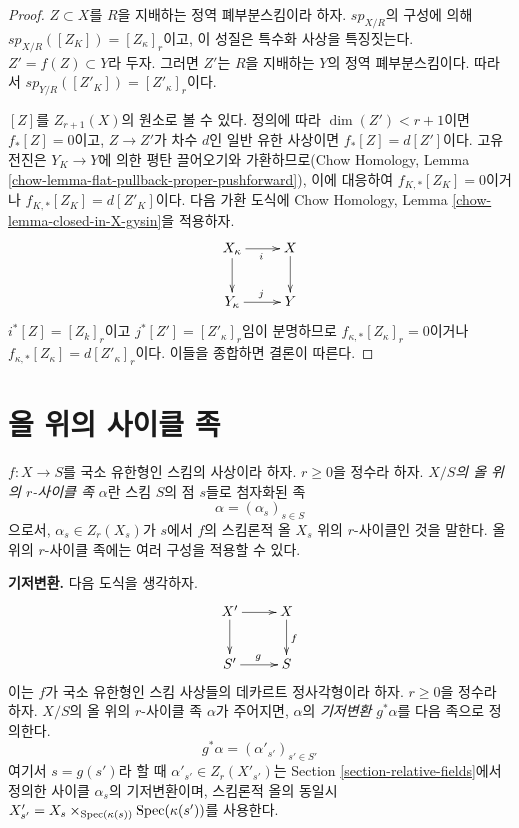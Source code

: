 \begin{proof}
$Z \subset X$를 $R$을 지배하는 정역 폐부분스킴이라 하자.
$sp_{X/R}$의 구성에 의해 $sp_{X/R}([Z_K]) = [Z_\kappa]_r$이고,
이 성질은 특수화 사상을 특징짓는다. $Z' = f(Z) \subset Y$라 두자.
그러면 $Z'$는 $R$을 지배하는 $Y$의 정역 폐부분스킴이다. 따라서
$sp_{Y/R}([Z'_K]) = [Z'_\kappa]_r$이다.

\medskip\noindent
$[Z]$를 $Z_{r + 1}(X)$의 원소로 볼 수 있다. 정의에 따라
$\dim(Z') < r + 1$이면 $f_*[Z] = 0$이고, $Z \to Z'$가 차수 $d$인
일반 유한 사상이면 $f_*[Z] = d[Z']$이다. 고유 전진은
$Y_K \to Y$에 의한 평탄 끌어오기와 가환하므로(Chow Homology,
Lemma \ref{chow-lemma-flat-pullback-proper-pushforward}), 이에 대응하여
$f_{K, *}[Z_K] = 0$이거나 $f_{K, *}[Z_K] = d[Z'_K]$이다.
다음 가환 도식에 Chow Homology, Lemma
\ref{chow-lemma-closed-in-X-gysin}을 적용하자.
$$
\xymatrix{
X_\kappa \ar[d] \ar[r]_i & X \ar[d] \\
Y_\kappa \ar[r]^j & Y
}
$$
$i^*[Z] = [Z_k]_r$이고 $j^*[Z'] = [Z'_\kappa]_r$임이 분명하므로
$f_{\kappa, *}[Z_\kappa]_r = 0$이거나
$f_{\kappa, *}[Z_\kappa] = d[Z'_\kappa]_r$이다. 이들을 종합하면
결론이 따른다.
\end{proof}


\section{올 위의 사이클 족}
\label{section-cycles-fibres}

\noindent
$f : X \to S$를 국소 유한형인 스킴의 사상이라 하자.
$r \geq 0$을 정수라 하자. {\it $X/S$의 올 위의 $r$-사이클 족
$\alpha$}란 스킴 $S$의 점 $s$들로 첨자화된 족
$$
\alpha = (\alpha_s)_{s \in S}
$$
으로서, $\alpha_s \in Z_r(X_s)$가 $s$에서 $f$의 스킴론적 올
$X_s$ 위의 $r$-사이클인 것을 말한다. 올 위의 $r$-사이클 족에는
여러 구성을 적용할 수 있다.

\medskip\noindent
{\bf 기저변환.} 다음 도식을 생각하자.
$$
\xymatrix{
X' \ar[r] \ar[d] & X \ar[d]^f \\
S' \ar[r]^g & S
}
$$
이는 $f$가 국소 유한형인 스킴 사상들의 데카르트 정사각형이라 하자.
$r \geq 0$을 정수라 하자. $X/S$의 올 위의 $r$-사이클 족
$\alpha$가 주어지면, $\alpha$의 {\it 기저변환} $g^*\alpha$를
다음 족으로 정의한다.
$$
g^*\alpha = (\alpha'_{s'})_{s' \in S'}
$$
여기서 $s = g(s')$라 할 때 $\alpha'_{s'} \in Z_r(X'_{s'})$는
Section \ref{section-relative-fields}에서 정의한 사이클 $\alpha_s$의
기저변환이며, 스킴론적 올의 동일시
$X'_{s'} = X_s \times_{\mathop{\mathrm{Spec}}(\kappa(s))} \mathop{\mathrm{Spec}}(\kappa(s'))$를 사용한다.

